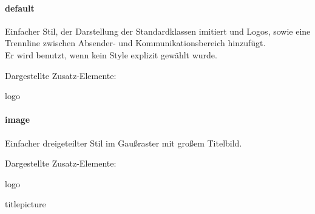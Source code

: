   \begin{minipage}[t]{0.33\textwidth}
    \null\centering\sffamily
  \end{minipage}%
  \hfill
  \begin{minipage}[t]{0.6\textwidth}
    \paragraph{default}
    Einfacher Stil, der Darstellung der Standardklassen imitiert und Logos,
    sowie eine Trennline zwischen Absender- und Kommunikationsbereich hinzufügt.
    \\
    Er wird benutzt, wenn kein Style explizit gewählt wurde.
    \par\bigskip
    \par\bigskip
    Dargestellte Zusatz-Elemente:
    \begin{compactitem}\ttfamily
      \item logo
    \end{compactitem}
  \end{minipage}
  
  \begin{minipage}[t]{0.33\textwidth}
    \null\centering\sffamily
  \end{minipage}%
  \hfill
  \begin{minipage}[t]{0.6\textwidth}
    \paragraph{image}
    
    Einfacher dreigeteilter Stil im Gaußraster mit großem Titelbild.
    \par\bigskip
    \par\bigskip
    Dargestellte Zusatz-Elemente:
    \begin{compactitem}\ttfamily
      \item logo
      \item titlepicture
    \end{compactitem}
  \end{minipage}
  
